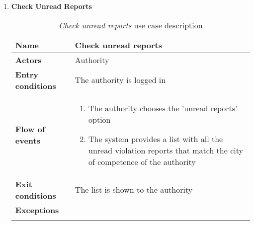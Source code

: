 \begin{enumerate}
			\item \textbf{Check Unread Reports}
				\begin{longtable}{p{0.25\linewidth}p{0.75\linewidth}}
					\toprule
					\textbf{Name} & \textbf{Check unread reports} \\
					\midrule
					\textbf{Actors} & Authority\\
					\midrule
					\textbf{Entry conditions} & The authority is logged in \\
					\midrule
					\textbf{Flow of events} & 
					\begin{enumerate}
						\item The authority chooses the 'unread reports' option
						\item The system provides a list with all the unread violation reports that match the city of competence of the authority
					\end{enumerate} \\
					\midrule
					\textbf{Exit conditions} & The list is shown to the authority\\
					\midrule
					\textbf{Exceptions} &  \\
					\bottomrule
					\caption{\emph{Check unread reports} use case description}
				\end{longtable}
				

\end{enumerate}

